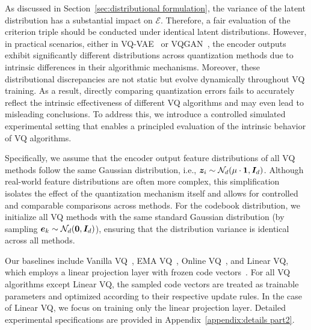 As discussed in Section~\ref{sec:distributional formulation}, the variance of the latent distribution has a substantial impact on $\mathcal{E}$. Therefore, a fair evaluation of the criterion triple should be conducted under identical latent distributions. However, in practical scenarios, either in VQ-VAE~\cite{Oord2017NeuralDR} or VQGAN~\cite{Esser2020TamingTF}, the encoder outputs exhibit significantly different distributions across quantization methods due to intrinsic differences in their algorithmic mechanisms. Moreover, these distributional discrepancies are not static but evolve dynamically throughout VQ training. As a result, directly comparing quantization errors fails to accurately reflect the intrinsic effectiveness of different VQ algorithms and may even lead to misleading conclusions. To address this, we introduce a controlled simulated experimental setting that enables a principled evaluation of the intrinsic behavior of VQ algorithms.

Specifically, we assume that the encoder output feature distributions of all VQ methods follow the same Gaussian distribution, i.e., $\bm{z}_i \sim \mathcal{N}_d(\mu \cdot \bm 1, \bm I_d)$. Although real-world feature distributions are often more complex, this simplification isolates the effect of the quantization mechanism itself and allows for controlled and comparable comparisons across methods. For the codebook distribution, we initialize all VQ methods with the same standard Gaussian distribution (by sampling $\bm{e}_k \sim \mathcal{N}_d(\bm 0, \bm I_d)$), ensuring that the distribution variance is identical across all methods.



Our baselines include Vanilla VQ~\cite{Oord2017NeuralDR}, EMA VQ~\cite{Razavi2019GeneratingDH}, Online VQ~\cite{Zheng2023OnlineCC}, and Linear VQ, which employs a linear projection layer with frozen code vectors~\cite{Zhu2024ScalingTC,Zhu2024AddressingRC}. For all VQ algorithms except Linear VQ, the sampled code vectors are treated as trainable parameters and optimized according to their respective update rules. In the case of Linear VQ, we focus on training only the linear projection layer. Detailed experimental specifications are provided in Appendix~\ref{appendix:details part2}.

